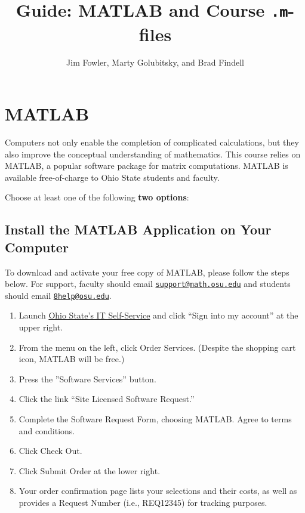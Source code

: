 \documentclass{article}
\title{Guide: MATLAB and Course \texttt{.m}-files}
\author{Jim Fowler, Marty Golubitsky, and Brad Findell}
\begin{document}
\maketitle

\section{MATLAB}\label{for-ohio-state-faculty-and-students}

Computers not only enable the completion of complicated calculations,
but they also improve the conceptual understanding of
mathematics. This course relies on MATLAB, a popular software package
for matrix computations. MATLAB is available free-of-charge to Ohio
State students and faculty.

Choose at least one of the following \textbf{two options}:

\subsection{Install the MATLAB Application on Your Computer}

To download and activate your free copy of MATLAB, please follow the
steps below.  For support, faculty should email
\href{mailto:support@math.osu.edu}{\texttt{support@math.osu.edu}} and
students should email
\href{mailto:8help@osu.edu}{\texttt{8help@osu.edu}}.

\begin{enumerate}
\def\labelenumi{\arabic{enumi})}
\item Launch \href{https://osuitsm.service-now.com/selfservice/}{Ohio
    State's IT Self-Service} and click ``Sign into my account'' at the upper right.
\item From the menu on the left, click Order Services. (Despite the shopping cart icon,
  MATLAB will be free.)
\item Press the ''Software Services'' button.  
\item Click the link ``Site Licensed Software Request.''
\item Complete the Software Request Form, choosing MATLAB. Agree to
  terms and conditions.
\item Click Check Out.
\item Click Submit Order at the lower right.
\item Your order confirmation page lists your selections and their
  costs, as well as provides a Request Number (i.e., REQ12345) for
  tracking purposes.
\end{enumerate}
\end{document}
